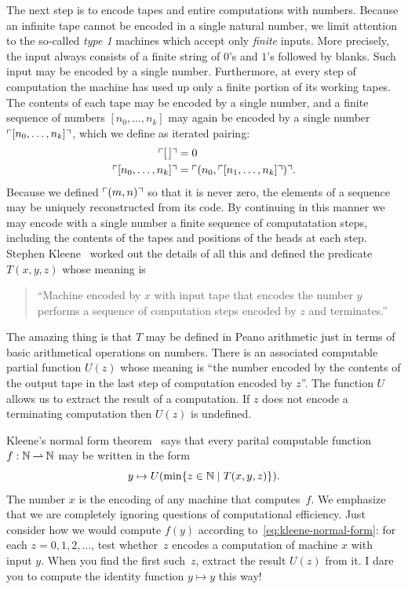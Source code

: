 The next step is to encode tapes and entire computations with numbers.
Because an infinite tape cannot be encoded in a single natural number,
we limit attention to the so-called \emph{type 1} machines which
accept only \emph{finite} inputs. More precisely, the input always
consists of a finite string of $0$'s and $1$'s followed by blanks.
Such input may be encoded by a single number. Furthermore, at every
step of computation the machine has used up only a finite portion of
its working tapes. The contents of each tape may be encoded by a
single number, and a finite sequence of numbers $[n_0, \ldots, n_k]$
may again be encoded by a single number $\ulcorner [n_0, \ldots, n_k] \urcorner$,
which we define as iterated pairing:
%
\begin{align*}
  \ulcorner [\,] \urcorner &= 0 \\
  \ulcorner [n_0, \ldots, n_k] \urcorner &= \ulcorner (n_0, \ulcorner [n_1, \ldots, n_k] \urcorner) \urcorner.
\end{align*}
%
Because we defined $\ulcorner (m,n) \urcorner$ so that it is never zero, the
elements of a sequence may be uniquely reconstructed from its code. By
continuing in this manner we may encode with a single number a finite
sequence of computatation steps, including the contents of the tapes
and positions of the heads at each step. Stephen Kleene~\cite{kleene43:_recur_predic_and_quant}
worked out the details of all this and defined the predicate
$T(x,y,z)$ whose meaning is
%
\begin{quote}
  ``Machine encoded by $x$ with input tape that encodes the number $y$
  performs a sequence of computation steps encoded by $z$ and
  terminates.''
\end{quote}
%
The amazing thing is that $T$ may be defined in Peano arithmetic just
in terms of basic arithmetical operations on numbers. There is an
associated computable partial function $U(z)$ whose meaning is ``the
number encoded by the contents of the output tape in the last step of
computation encoded by $z$''. The function $U$ allows us to extract
the result of a computation. If $z$ does not encode a terminating
computation then $U(z)$ is undefined.

Kleene's normal form theorem~\cite{kleene43:_recur_predic_and_quant}
says that every parital computable function $f : \mathbb{N} \mathbin{\rightharpoonup} \mathbb{N}$ may
be written in the form
%
\begin{equation}
  \label{eq:kleene-normal-form}
  y \mapsto U(\min \{z \in \mathbb{N} \mid T(x,y,z)\}).
\end{equation}
%
The number $x$ is the encoding of any machine that computes~$f$. We
emphasize that we are completely ignoring questions of computational
efficiency. Just consider how we would compute $f(y)$ according
to~\eqref{eq:kleene-normal-form}: for each $z = 0, 1, 2, \ldots$, test
whether~$z$ encodes a computation of machine $x$ with input $y$. When
you find the first such~$z$, extract the result $U(z)$ from it. I dare
you to compute the identity function $y \mapsto y$ this way!

